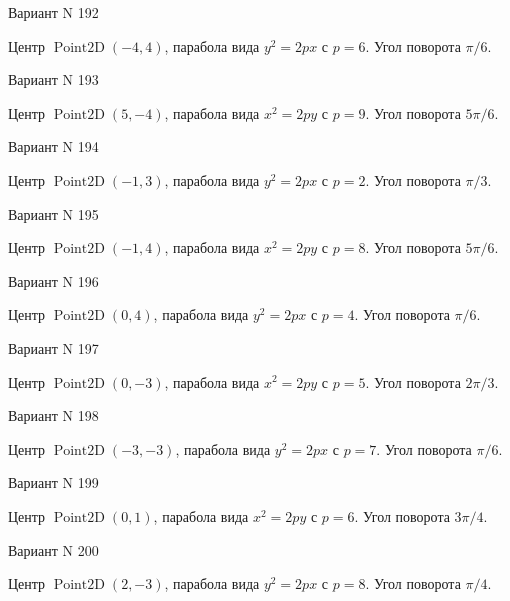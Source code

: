 \documentclass[11pt]{report}
\begin{document}
Вариант N 192

Центр $\operatorname{Point2D}\left(-4, 4\right)$, парабола вида $y^{2} = 2px$ с $p = 6$. Угол поворота $\pi / 6$.

Вариант N 193

Центр $\operatorname{Point2D}\left(5, -4\right)$, парабола вида $x^{2} = 2py$ с $p = 9$. Угол поворота $5 \pi / 6$.

Вариант N 194

Центр $\operatorname{Point2D}\left(-1, 3\right)$, парабола вида $y^{2} = 2px$ с $p = 2$. Угол поворота $\pi / 3$.

Вариант N 195

Центр $\operatorname{Point2D}\left(-1, 4\right)$, парабола вида $x^{2} = 2py$ с $p = 8$. Угол поворота $5 \pi / 6$.

Вариант N 196

Центр $\operatorname{Point2D}\left(0, 4\right)$, парабола вида $y^{2} = 2px$ с $p = 4$. Угол поворота $\pi / 6$.

Вариант N 197

Центр $\operatorname{Point2D}\left(0, -3\right)$, парабола вида $x^{2} = 2py$ с $p = 5$. Угол поворота $2 \pi / 3$.

Вариант N 198

Центр $\operatorname{Point2D}\left(-3, -3\right)$, парабола вида $y^{2} = 2px$ с $p = 7$. Угол поворота $\pi / 6$.

Вариант N 199

Центр $\operatorname{Point2D}\left(0, 1\right)$, парабола вида $x^{2} = 2py$ с $p = 6$. Угол поворота $3 \pi / 4$.

Вариант N 200

Центр $\operatorname{Point2D}\left(2, -3\right)$, парабола вида $y^{2} = 2px$ с $p = 8$. Угол поворота $\pi / 4$.
\end{document}
